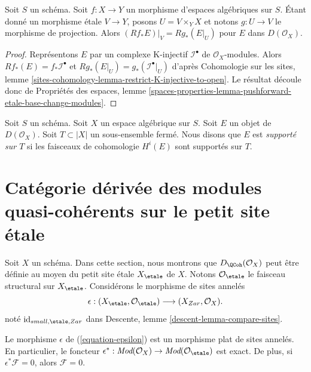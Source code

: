 \begin{lemma}
\label{lemma-restrict-direct-image-open}
Soit $S$ un schéma. Soit $f : X \to Y$ un morphisme d'espaces algébriques
sur $S$. Étant donné un morphisme \'etale $V \to Y$, posons $U = V \times_Y X$
et notons $g : U \to V$ le morphisme de projection. Alors
$(Rf_*E)|_V = Rg_*(E|_U)$ pour $E$ dans $D(\mathcal{O}_X)$.
\end{lemma}

\begin{proof}
Représentons $E$ par un complexe K-injectif $\mathcal{I}^\bullet$ de
$\mathcal{O}_X$-modules. Alors $Rf_*(E) = f_*\mathcal{I}^\bullet$
et $Rg_*(E|_U) = g_*(\mathcal{I}^\bullet|_U)$ d'après
Cohomologie sur les sites, lemme
\ref{sites-cohomology-lemma-restrict-K-injective-to-open}.
Le résultat découle donc de
Propriétés des espaces,
lemme \ref{spaces-properties-lemma-pushforward-etale-base-change-modules}.
\end{proof}

\begin{definition}
\label{definition-supported-on}
Soit $S$ un schéma. Soit $X$ un espace algébrique sur $S$.
Soit $E$ un objet de $D(\mathcal{O}_X)$.
Soit $T \subset |X|$ un sous-ensemble fermé.
Nous disons que $E$ est {\it supporté sur $T$} si les
faisceaux de cohomologie $H^i(E)$ sont supportés sur $T$.
\end{definition}








\section{Catégorie dérivée des modules quasi-cohérents sur le petit site \'etale}
\label{section-derived-quasi-coherent-etale}

\noindent
Soit $X$ un schéma. Dans cette section, nous montrons que
$D_\QCoh(\mathcal{O}_X)$
peut être définie au moyen du petit site \'etale $X_\etale$ de $X$.
Notons $\mathcal{O}_\etale$ le faisceau structural sur
$X_\etale$. 
Considérons le morphisme de sites annelés
\begin{equation}
\label{equation-epsilon}
\epsilon :
(X_\etale, \mathcal{O}_\etale)
\longrightarrow
(X_{Zar}, \mathcal{O}_X).
\end{equation}
noté $\text{id}_{small, \etale, Zar}$ dans
Descente, lemme \ref{descent-lemma-compare-sites}.

\begin{lemma}
\label{lemma-epsilon-flat}
Le morphisme $\epsilon$ de (\ref{equation-epsilon})
est un morphisme plat de sites annelés. En particulier, le foncteur
$\epsilon^* : \textit{Mod}(\mathcal{O}_X) \to
\textit{Mod}(\mathcal{O}_\etale)$ est exact.
De plus, si $\epsilon^*\mathcal{F} = 0$, alors $\mathcal{F} = 0$.
\end{lemma}


